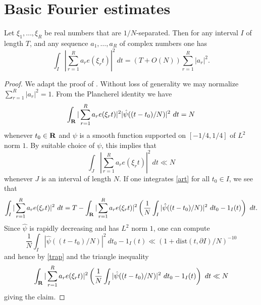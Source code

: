 \chapter{Basic Fourier estimates}\label{l2-chapter}

\begin{lemma}\label{l2-int}
\leanok
Let $\xi_1,\dots,\xi_R$ be real numbers that are $1/N$-separated.  Then for any interval $I$ of length $T$, and any sequence $a_1,\dots,a_R$ of complex numbers one has
$$ \int_I |\sum_{r=1}^R a_r e(\xi_r t)|^2\ dt = (T + O(N)) \sum_{r=1}^R |a_r|^2.$$
\end{lemma}

\begin{proof}\leanok We adapt the proof of \cite[Theorem 9.1]{ik}.  Without loss of generality we may normalize
    $\sum_{r=1}^R |a_r|^2=1$.    From the Plancherel identity we have
\begin{equation}\label{art}
 \int_{\mathbf{R}} |\sum_{r=1}^R a_r e(\xi_r t)|^2 |\hat \psi((t-t_0)/N)|^2\ dt = N
 \end{equation}
whenever $t_0 \in \mathbf{R}$ and $\psi$ is a smooth function supported on $[-1/4, 1/4]$ of $L^2$ norm $1$.   By suitable choice of $\psi$, this implies that
\begin{equation}\label{trap}
 \int_J |\sum_{r=1}^R a_r e(\xi_r t)|^2\ dt \ll N
\end{equation}
whenever $J$ is an interval of length $N$.  If one integrates \eqref{art} for all $t_0 \in I$, we see that
$$ \int_I |\sum_{r=1}^R a_r e(\xi_r t)|^2\ dt = T - \int_\R |\sum_{r=1}^R a_r e(\xi_r t)|^2 \left(\frac{1}{N} \int_I |\hat \psi((t-t_0)/N)|^2\ dt_0 - 1_I(t)\right)\ dt.$$
Since $\hat \psi$ is rapidly decreasing and has $L^2$ norm $1$, one can compute
$$ \frac{1}{N} \int_I |\hat \psi((t-t_0)/N)|^2\ dt_0 - 1_I(t) \ll (1 + \mathrm{dist}(t, \partial I) / N)^{-10}$$
and hence by \eqref{trap} and the triangle inequality
$$ \int_\R |\sum_{r=1}^R a_r e(\xi_r t)|^2 \left(\frac{1}{N} \int_I |\hat \psi((t-t_0)/N)|^2\ dt_0 - 1_I(t)\right)\ dt \ll N$$
giving the claim.
\end{proof}
